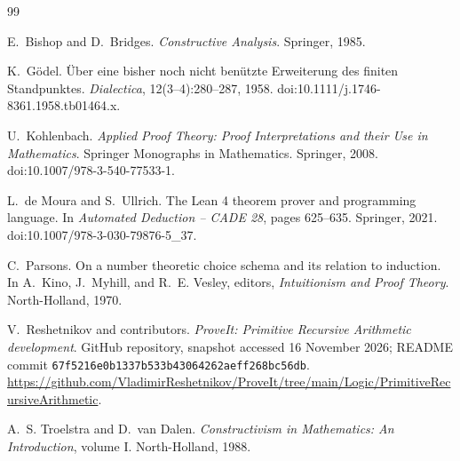 \documentclass[11pt,oneside]{article}
\theoremstyle{definition}
\theoremstyle{remark}
\begin{document}
\begin{thebibliography}{99}

E.~Bishop and D.~Bridges.
\newblock \emph{Constructive Analysis}.
\newblock Springer, 1985.

K.~G\"odel.
\newblock \"Uber eine bisher noch nicht ben\"utzte Erweiterung des finiten
  Standpunktes.
\newblock \emph{Dialectica}, 12(3--4):280--287, 1958.
\newblock doi:10.1111/j.1746-8361.1958.tb01464.x.

U.~Kohlenbach.
\newblock \emph{Applied Proof Theory: Proof Interpretations and their Use in
  Mathematics}.
\newblock Springer Monographs in Mathematics. Springer, 2008.
\newblock doi:10.1007/978-3-540-77533-1.

L.~de Moura and S.~Ullrich.
\newblock The Lean 4 theorem prover and programming language.
\newblock In \emph{Automated Deduction -- CADE 28}, pages 625--635. Springer,
  2021.
\newblock doi:10.1007/978-3-030-79876-5\_37.

C.~Parsons.
\newblock On a number theoretic choice schema and its relation to induction.
\newblock In A.~Kino, J.~Myhill, and R.~E. Vesley, editors,
  \emph{Intuitionism and Proof Theory}. North-Holland, 1970.

V.~Reshetnikov and contributors.
\newblock \emph{ProveIt: Primitive Recursive Arithmetic development}.
\newblock GitHub repository, snapshot accessed 16 November 2026; README commit
  \texttt{67f5216e0b1337b533b43064262aeff268bc56db}.
\newblock \url{https://github.com/VladimirReshetnikov/ProveIt/tree/main/Logic/PrimitiveRecursiveArithmetic}.

A.~S. Troelstra and D.~van Dalen.
\newblock \emph{Constructivism in Mathematics: An Introduction}, volume I.
\newblock North-Holland, 1988.

\end{thebibliography}
\end{document}

